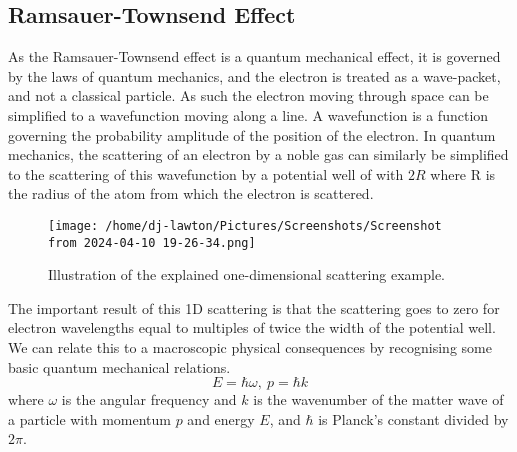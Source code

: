 \documentclass{article}
\begin{document}
\subsection{Ramsauer-Townsend Effect}
As the Ramsauer-Townsend effect is a quantum mechanical effect, it is governed by the laws of quantum mechanics, and the electron is treated as a wave-packet, and not a classical particle. As such the electron moving through space can be simplified to a wavefunction moving along a line. A wavefunction is a function governing the probability amplitude of the position of the electron. In quantum mechanics, the scattering of an electron by a noble gas can similarly be simplified to the scattering of this wavefunction by a potential well of with $2R$ where R is the radius of the atom from which the electron is scattered.
\begin{figure}[H]
\begin{center}
\texttt{[image: /home/dj-lawton/Pictures/Screenshots/Screenshot from 2024-04-10 19-26-34.png]}
\caption{\label{fig: QMRTEff}Illustration of the explained one-dimensional  scattering example.}
\end{center}
\end{figure}
The important result of this 1D scattering is that the scattering goes to zero for electron wavelengths equal to multiples of  twice the width of the potential well.\\
\indent We can relate this to a  macroscopic physical consequences by recognising some basic quantum mechanical relations.
\begin{equation}
E=\hbar\omega,~p=\hbar k
\end{equation} 
where $\omega$ is the angular frequency and $k$ is the wavenumber of the matter wave of a particle with momentum $p$ and energy $E$, and $\hbar$ is Planck's constant divided by $2\pi$.
\end{document}
